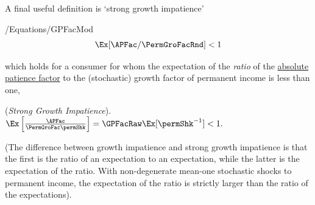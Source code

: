 \documentclass[BufferStockTheory]{subfiles}
\begin{document}
A final useful definition is `strong growth impatience'
\begin{verbatimwrite}{\econtexRoot/Equations/GPFacMod}
  \begin{equation}\label{eq:GPFacMod}
    \Ex[\APFac/\PermGroFacRnd] < 1
  \end{equation}
\end{verbatimwrite}

which holds for a consumer for whom the expectation of the \textit{ratio} of the \hyperlink{APFac}{absolute patience factor} to the (stochastic) growth factor of permanent income is less than one, 
\hypertarget{GICMod}{}
\begin{assumS}(\textit{Strong Growth Impatience}). \label{ass:GICMod}
$ \Ex\left[\frac{\APFac}{\PermGroFac \permShk}\right] = \GPFacMod  < 1.$
\end{assumS}

(The difference between growth impatience and strong growth impatience is that the first is the ratio of an expectation to an expectation, while the latter is the expectation of the ratio.
With non-degenerate mean-one stochastic shocks to permanent income, the expectation of the ratio is strictly larger than the ratio of the expectations).

\end{document}
